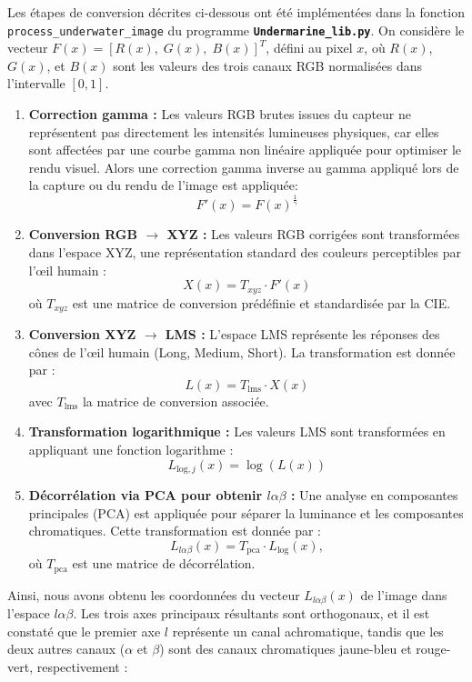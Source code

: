 \documentclass[10pt, a4paper]{extarticle}
\numberwithin{equation}{section}
\numberwithin{figure}{section}
\begin{document}
\par Les étapes de conversion décrites ci-dessous ont été implémentées dans la fonction \colorbox{gray!15}{\texttt{process\_underwater\_image}} du programme \colorbox{gray!15}{\texttt{\textbf{Undermarine\_lib.py}}}. On considère le vecteur \( F(x) = \left[ R(x), \;  G(x), \; B(x) \right]^T \), défini au pixel \( x \), où \( R(x) \), \( G(x) \), et \( B(x) \) sont les valeurs des trois canaux RGB normalisées dans l'intervalle \([0, 1]\).
\vspace{3mm}
\begin{enumerate}
    \item \textbf{Correction gamma :} Les valeurs RGB brutes issues du capteur ne représentent pas directement les intensités lumineuses physiques, car elles sont affectées par une courbe gamma non linéaire appliquée pour optimiser le rendu visuel. Alors une correction gamma inverse au gamma appliqué lors de la capture ou du rendu de l'image est appliquée:
\[
F'(x) = F(x)^{\frac{1}{\gamma}}
\]

    \item \textbf{Conversion RGB \(\to\) XYZ :}  
    Les valeurs RGB corrigées sont transformées dans l'espace XYZ, une représentation standard des couleurs perceptibles par l'œil humain :
    \[
    X(x) = T_{xyz} \cdot F'(x)
    \]
    où \( T_{xyz} \) est une matrice de conversion prédéfinie et standardisée par la CIE.

    \item \textbf{Conversion XYZ \(\to\) LMS :}  
    L'espace LMS représente les réponses des cônes de l'œil humain (Long, Medium, Short). La transformation est donnée par :
    \[
    L(x) = T_{\text{lms}} \cdot X(x)
    \]
    avec $T_{\text{lms}}$ la matrice de conversion associée.

    \item \textbf{Transformation logarithmique :}  
    Les valeurs LMS sont transformées en appliquant une fonction logarithme :
    \[
    L_{\text{log}, j}(x) = \log\left(L(x)\right)
    \]

    \item \textbf{Décorrélation via PCA pour obtenir \( l\alpha\beta \) :}  
    Une analyse en composantes principales (PCA) est appliquée pour séparer la luminance et les composantes chromatiques. Cette transformation est donnée par :
    \[
    L_{l\alpha\beta}(x) = T_{\text{pca}} \cdot L_{\text{log}}(x),
    \]
    où \( T_{\text{pca}} \) est une matrice de décorrélation. 

\end{enumerate}
\vspace{3mm}
\par Ainsi, nous avons obtenu les coordonnées du vecteur \( L_{l\alpha\beta}(x) \) de l'image dans l'espace \( l\alpha\beta \). Les trois axes principaux résultants sont orthogonaux, et il est constaté que le premier axe \( l \) représente un canal achromatique, tandis que les deux autres canaux (\( \alpha \) et \( \beta \)) sont des canaux chromatiques jaune-bleu et rouge-vert, respectivement :
\end{document}
